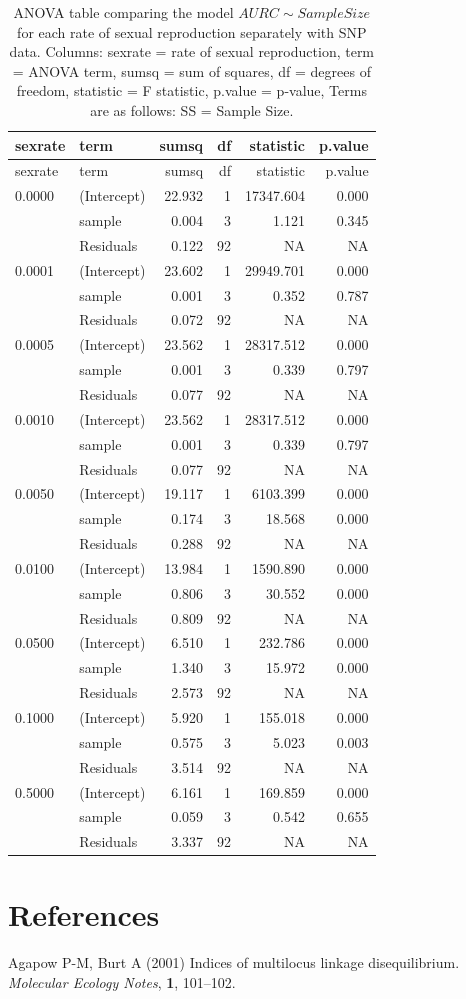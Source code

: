 \documentclass[]{article}
\theoremstyle{definition}
\theoremstyle{definition}
\theoremstyle{definition}
\theoremstyle{remark}
\begin{document}
\begin{longtable}[]{@{}llrrrr@{}}
\caption{\label{tab:sim5} ANOVA table comparing the model
\(AURC \sim Sample Size\) for each rate of sexual reproduction
separately with SNP data. Columns: sexrate = rate of sexual
reproduction, term = ANOVA term, sumsq = sum of squares, df = degrees of
freedom, statistic = F statistic, p.value = p-value, Terms are as
follows: SS = Sample Size.}\tabularnewline
\toprule
sexrate & term & sumsq & df & statistic & p.value\tabularnewline
\midrule
\endfirsthead
\toprule
sexrate & term & sumsq & df & statistic & p.value\tabularnewline
\midrule
\endhead
0.0000 & (Intercept) & 22.932 & 1 & 17347.604 & 0.000\tabularnewline
& sample & 0.004 & 3 & 1.121 & 0.345\tabularnewline
& Residuals & 0.122 & 92 & NA & NA\tabularnewline
0.0001 & (Intercept) & 23.602 & 1 & 29949.701 & 0.000\tabularnewline
& sample & 0.001 & 3 & 0.352 & 0.787\tabularnewline
& Residuals & 0.072 & 92 & NA & NA\tabularnewline
0.0005 & (Intercept) & 23.562 & 1 & 28317.512 & 0.000\tabularnewline
& sample & 0.001 & 3 & 0.339 & 0.797\tabularnewline
& Residuals & 0.077 & 92 & NA & NA\tabularnewline
0.0010 & (Intercept) & 23.562 & 1 & 28317.512 & 0.000\tabularnewline
& sample & 0.001 & 3 & 0.339 & 0.797\tabularnewline
& Residuals & 0.077 & 92 & NA & NA\tabularnewline
0.0050 & (Intercept) & 19.117 & 1 & 6103.399 & 0.000\tabularnewline
& sample & 0.174 & 3 & 18.568 & 0.000\tabularnewline
& Residuals & 0.288 & 92 & NA & NA\tabularnewline
0.0100 & (Intercept) & 13.984 & 1 & 1590.890 & 0.000\tabularnewline
& sample & 0.806 & 3 & 30.552 & 0.000\tabularnewline
& Residuals & 0.809 & 92 & NA & NA\tabularnewline
0.0500 & (Intercept) & 6.510 & 1 & 232.786 & 0.000\tabularnewline
& sample & 1.340 & 3 & 15.972 & 0.000\tabularnewline
& Residuals & 2.573 & 92 & NA & NA\tabularnewline
0.1000 & (Intercept) & 5.920 & 1 & 155.018 & 0.000\tabularnewline
& sample & 0.575 & 3 & 5.023 & 0.003\tabularnewline
& Residuals & 3.514 & 92 & NA & NA\tabularnewline
0.5000 & (Intercept) & 6.161 & 1 & 169.859 & 0.000\tabularnewline
& sample & 0.059 & 3 & 0.542 & 0.655\tabularnewline
& Residuals & 3.337 & 92 & NA & NA\tabularnewline
\bottomrule
\end{longtable}

\section*{References}\label{references}

\hypertarget{refs}{}
\hypertarget{ref-Agapow_2001}{}
Agapow P-M, Burt A (2001) Indices of multilocus linkage disequilibrium.
\emph{Molecular Ecology Notes}, \textbf{1}, 101--102.
\end{document}
